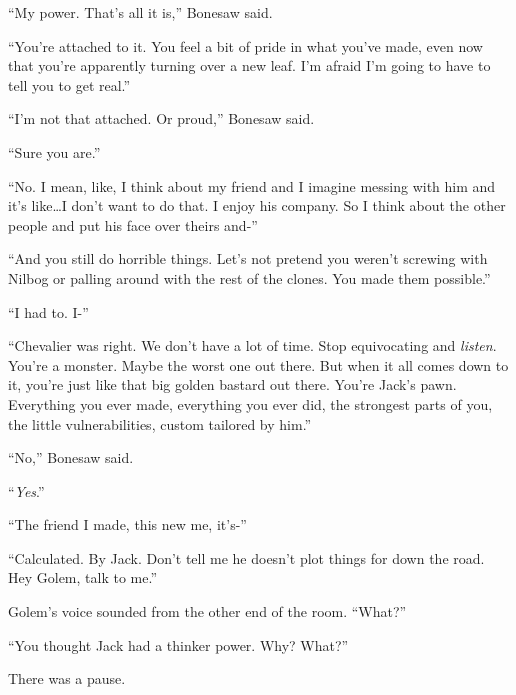 ``My power.  That's all it is,'' Bonesaw said.



``You're attached to it.  You feel a bit of pride in what you've made, even now that you're apparently turning over a new leaf.  I'm afraid I'm going to have to tell you to get real.''



``I'm not that attached.  Or proud,'' Bonesaw said.



``Sure you are.''



``No.  I mean, like, I think about my friend and I imagine messing with him and it's like\ldots I don't want to do that.  I enjoy his company.  So I think about the other people and put his face over theirs and-''



``And you still do horrible things.  Let's not pretend you weren't screwing with Nilbog or palling around with the rest of the clones.  You made them possible.''



``I had to.  I-''



``Chevalier was right.  We don't have a lot of time.  Stop equivocating and \emph{listen}.  You're a monster.  Maybe the worst one out there.  But when it all comes down to it, you're just like that big golden bastard out there.  You're Jack's pawn.  Everything you ever made, everything you ever did, the strongest parts of you, the little vulnerabilities, custom tailored by him.''



``No,'' Bonesaw said.



``\emph{Yes}.''



``The friend I made, this new me, it's-''



``Calculated.  By Jack.  Don't tell me he doesn't plot things for down the road.  Hey Golem, talk to me.''



Golem's voice sounded from the other end of the room.  ``What?''



``You thought Jack had a thinker power.  Why?  What?''



There was a pause.



